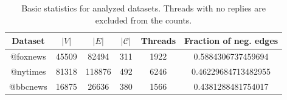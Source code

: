 \begin{table}
	\centering
	\caption{Basic statistics for analyzed datasets. Threads with no replies
		are excluded from the counts.}
	\label{tab:basic-statistics}
	\begin{tabular}{|c c c c c c|}
		\toprule
		Dataset  & $|V|$ & $|E|$  & $|\mathcal{C} |$ & Threads & Fraction of
		neg. edges                                                                         \\
		\midrule
		@foxnews & 45509 & 82494  & 311              & 1922    & \num{0.5884306737459694}  \\
		@nytimes & 81318 & 118876 & 492              & 6246    & \num{0.46229684713482955} \\
		@bbcnews & 16875 & 26636  & 380              & 1566    & \num{0.4381288481754017}  \\
		\bottomrule
	\end{tabular}
\end{table}

